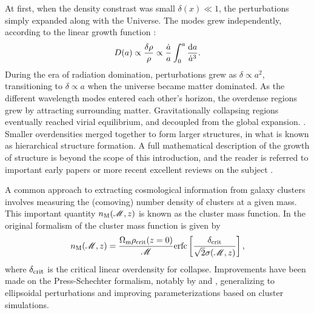 At first, when the density constrast was small $\delta(x) \ll 1$, the perturbations simply expanded along with the Universe. The modes grew independently, according to the linear growth function \citep{PeeblesText,Voit05}:
\begin{equation}
D(a) \propto \frac{\delta \rho}{\rho} \propto \frac{\dot{a}}{a} \int_0^a \frac{{\rm d}a}{\dot{a}^3}.
\end{equation}
During the era of radiation domination, perturbations grew as $\delta \propto a^2$, transitioning to $\delta \propto a$ when the universe became matter dominated. As the different wavelength modes entered each other's horizon, the overdense regions grew by attracting surrounding matter. Gravitationally collapsing regions eventually reached virial equilibrium, and decoupled from the global expansion. \citep{Schneider06_IntroGravLensCosmology}. Smaller overdensities merged together to form larger structures, in what is known as hierarchical structure formation. A full mathematical description of the growth of structure is beyond the scope of this introduction,  and the reader is referred to important early papers \citep[e.g.][]{PS74,GottRees75} or more recent excellent reviews on the subject \citep[e.g.][]{Voit05,Schneider06_IntroGravLensCosmology,Kravtsov12}. 

A common approach to extracting cosmological information from galaxy clusters involves measuring the (comoving) number density of clusters at a given mass.  This important quantity $n_{\rm M} ({\mathscr M},z)$ is known as the cluster mass function. In the original formalism of \citet{PS74} the cluster mass function is given by
\begin{equation}
\label{eqn:massfunc}
n_{\rm M} ({\mathscr M},z) = \frac{\Omega_{\rm m} \rho_{\rm crit}(z=0)}{\mathscr M} {\rm erfc}\left[ \frac{\delta_{\rm crit}}{\sqrt{2}\sigma({\mathscr M},z)} \right],
\end{equation}
where $\delta_{\rm crit}$ is the critical linear overdensity for collapse. Improvements have been made on the Press-Schechter formalism, notably by \citet{Sheth99} and \citet{Jenkins01}, generalizing to ellipsoidal perturbations and improving parameterizations based on cluster simulations. 

